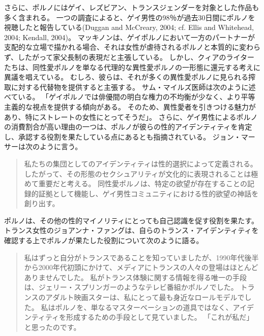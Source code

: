 \documentclass[paper=a4,book,openany]{jlreq} \usepackage{mystyle}
\begin{document}
さらに、ポルノにはゲイ、レズビアン、トランスジェンダーを対象とした作品も多く含まれる。
一つの調査によると、ゲイ男性の98％が過去30日間にポルノを視聴したと報告している(Duggan and McCreary, 2004; cf. Ellis and Whitehead, 2004; Kendall, 2004)。
\nocite{duggan04:_body_image_eatin_disor_drive}\nocite{ellis04:_porn_again}
\nocite{kendall04:_educat_gay_male_youth}
マッキノンは、ゲイポルノにおいて一方のパートナーが支配的な立場で描かれる場合、それは女性が虐待されるポルノと本質的に変わらず、したがって家父長制の表現だと主張している\citep[pp.178--179]{mackinnon89:_towar_femin_theor_of_state}。
しかし、クィアのライターたちは、同性愛ポルノを単なる代理的な異性愛ポルノの一形態に還元する考えに異議を唱えている。
むしろ、彼らは、それが多くの異性愛ポルノに見られる搾取に対する代替物を提供すると主張する。
サム・マイルズ医師は次のように述べている。
「ゲイポルノでは俳優間の明白な権力の不均衡が少なく、より平等主義的な視点を提供する傾向がある。
そのため、異性愛者を引きつける魅力があり、特にストレートの女性にとってそうだ」\citep{bloodworth18:_this_is_why_straig_men}。
さらに、ゲイ男性によるポルノの消費割合が高い理由の一つは、ポルノが彼らの性的アイデンティティを肯定し、承認する役割を果たしている点にあるとも指摘されている。
ジョン・マーサーは次のように言う。

\begin{quote}
私たちの集団としてのアイデンティティは性的選択によって定義される。
したがって、その形態のセクシュアリティが文化的に表現されることは極めて重要だと考える。
同性愛ポルノは、特定の欲望が存在することの記録的証拠として機能し、ゲイ男性コミュニティにおける性的欲望の神話を創り出す。
\citep[p.204]{ellis13:_porn_again}
\end{quote}
ポルノは、その他の性的マイノリティにとっても自己認識を促す役割を果たす。
トランス女性のジョアンナ・ファングは、自らのトランス・アイデンティティを確認する上でポルノが果たした役割について次のように語る。
\begin{quote}

  私はずっと自分がトランスであることを知っていましたが、1990年代後半から2000年代初頭にかけて、メディアにトランスの人々の登場はほとんどありませんでした。
私がトランス体験に関する情報を得る唯一の手段は、ジェリー・スプリンガーのようなテレビ番組かポルノでした。
トランスのアダルト映画スターは、私にとって最も身近なロールモデルでした。
私はポルノを、単なるマスターベーションの道具ではなく、アイデンティティを形成するための手段として見ていました。
「これが私だ」と思ったのです。
\citep{white17:_how_trans_affec_sex_drive_porn_consum}
\end{quote}
\end{document}
